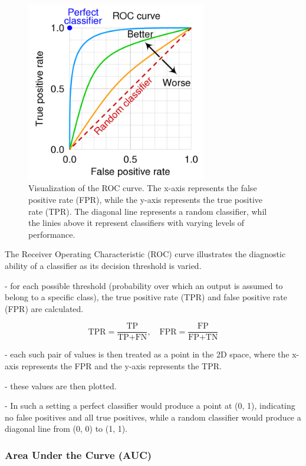 \documentclass{pracalicmgr}
\begin{document}
\begin{figure}[H]
    \centering
    \includegraphics[width=0.7\textwidth]{src/roc-curveUp.jpg}
    \caption{Visualization of the ROC curve. The x-axis represents the false positive rate (FPR), while the y-axis represents the true positive rate (TPR). The diagonal line represents a random classifier, whil the linies above it represent classifiers with varying levels of performance.}
\end{figure}

The Receiver Operating Characteristic (ROC) curve illustrates the diagnostic ability of a classifier as its decision threshold is varied. 

- for each possible threshold (probability over which an output is assumed to belong to a specific class), the true positive rate (TPR) and false positive rate (FPR) are calculated.

\[
\text{TPR} = \frac{\text{TP}}{\text{TP} + \text{FN}}, \quad
\text{FPR} = \frac{\text{FP}}{\text{FP} + \text{TN}}
\]


- each such pair of values is then treated as a point in the 2D space, where the x-axis represents the FPR and the y-axis represents the TPR.

- these values are then plotted.

- In such a setting a perfect classifier would produce a point at (0, 1), indicating no false positives and all true positives, while a random classifier would produce a diagonal line from (0, 0) to (1, 1).

\subsubsection{Area Under the Curve (AUC)}
\end{document}
